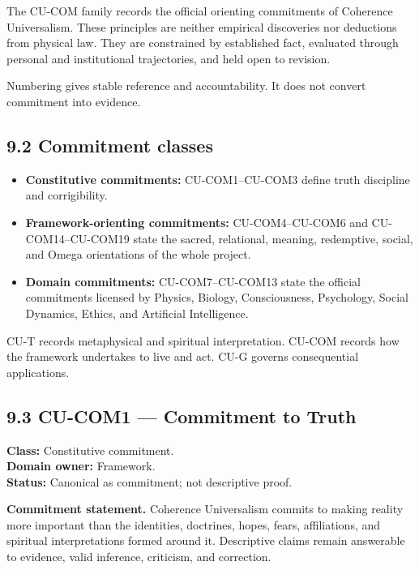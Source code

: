 \documentclass[
  11pt,
]{article}
\providecommand{\tightlist}{%
  \setlength{\itemsep}{0pt}\setlength{\parskip}{0pt}}
\begin{document}
The CU-COM family records the official orienting commitments of
Coherence Universalism. These principles are neither empirical
discoveries nor deductions from physical law. They are constrained by
established fact, evaluated through personal and institutional
trajectories, and held open to revision.

Numbering gives stable reference and accountability. It does not convert
commitment into evidence.

\subsection{9.2 Commitment classes}\label{commitment-classes}

\begin{itemize}
\tightlist
\item
  \textbf{Constitutive commitments:} CU-COM1--CU-COM3 define truth
  discipline and corrigibility.
\item
  \textbf{Framework-orienting commitments:} CU-COM4--CU-COM6 and
  CU-COM14--CU-COM19 state the sacred, relational, meaning, redemptive,
  social, and Omega orientations of the whole project.
\item
  \textbf{Domain commitments:} CU-COM7--CU-COM13 state the official
  commitments licensed by Physics, Biology, Consciousness, Psychology,
  Social Dynamics, Ethics, and Artificial Intelligence.
\end{itemize}

CU-T records metaphysical and spiritual interpretation. CU-COM records
how the framework undertakes to live and act. CU-G governs consequential
applications.

\subsection{9.3 CU-COM1 --- Commitment to
Truth}\label{cu-com1-commitment-to-truth}

\textbf{Class:} Constitutive commitment.\\
\textbf{Domain owner:} Framework.\\
\textbf{Status:} Canonical as commitment; not descriptive proof.

\textbf{Commitment statement.} Coherence Universalism commits to making
reality more important than the identities, doctrines, hopes, fears,
affiliations, and spiritual interpretations formed around it.
Descriptive claims remain answerable to evidence, valid inference,
criticism, and correction.
\end{document}
